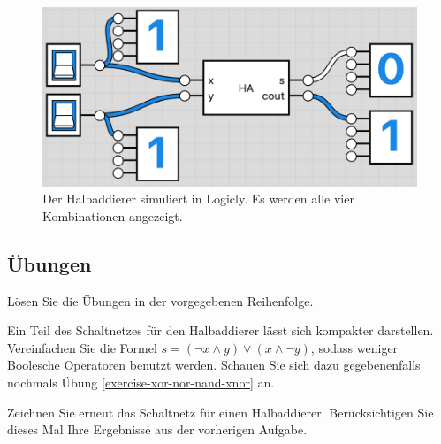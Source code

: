 \begin{figure}[H]
\begin{minipage}{0.45\textwidth}
\end{minipage}
\begin{minipage}{0.45\textwidth}
\centering
\includegraphics[width=\textwidth]{ha_4}
\end{minipage}
\caption{Der Halbaddierer simuliert in Logicly. Es werden alle vier Kombinationen angezeigt.}
\end{figure}

\newpage

\subsection{Übungen}

Lösen Sie die Übungen in der vorgegebenen Reihenfolge.

\begin{exercise}
Ein Teil des Schaltnetzes für den Halbaddierer lässt sich kompakter darstellen. Vereinfachen Sie die Formel $s = (\neg x \wedge y) \vee (x \wedge \neg y)$, sodass weniger Boolesche Operatoren benutzt werden. Schauen Sie sich dazu gegebenenfalls nochmals Übung \ref{exercise-xor-nor-nand-xnor} an.
\fillwithgrid{1in}
\end{exercise}

\begin{exercise}
Zeichnen Sie erneut das Schaltnetz für einen Halbaddierer. Berücksichtigen Sie dieses Mal Ihre Ergebnisse aus der vorherigen Aufgabe.
\end{exercise}